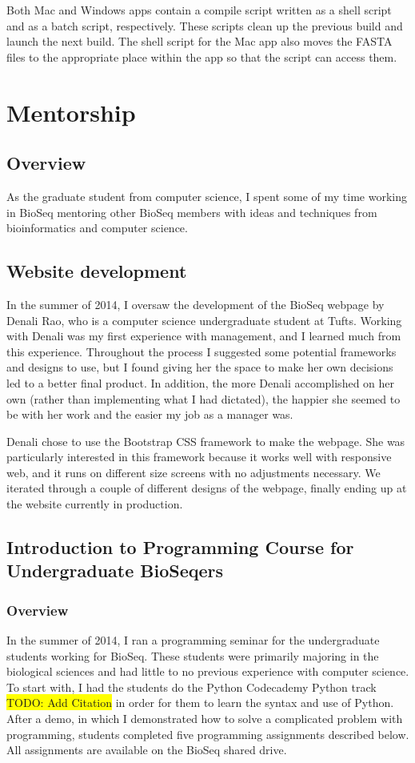 \documentclass{report}
\newcommand{\hilight}[1]
{\colorbox{yellow}{#1}}
\begin{document}
Both Mac and Windows apps contain a compile script written as a shell script and as a batch script, respectively. These scripts clean up the previous build and launch the next build. The shell script for the Mac app also moves the FASTA files to the appropriate place within the app so that the script can access them.


\chapter{Mentorship}
\section{Overview}
As the graduate student from computer science, I spent some of my time working in BioSeq mentoring other BioSeq members with ideas and techniques from  bioinformatics and computer science. 

\section{Website development}
In the summer of 2014, I oversaw the development of the BioSeq webpage by Denali Rao, who is a computer science undergraduate student at Tufts. Working with Denali was my first experience with management, and I learned much from this experience. Throughout the process I suggested some potential frameworks and designs to use, but I found giving her the space to make her own decisions led to a better final product. In addition, the more Denali accomplished on her own (rather than implementing what I had dictated), the happier she seemed to be with her work and the easier my job as a manager was.

Denali chose to use the Bootstrap CSS framework to make the webpage. She was particularly interested in this framework because it works well with responsive web, and it runs on different size screens with no adjustments necessary. We iterated through a couple of different designs of the webpage, finally ending up at the website currently in production.

\section{Introduction to Programming Course for Undergraduate BioSeqers}
\subsection{Overview}
In the summer of 2014, I ran a programming seminar for the undergraduate students working for BioSeq. These students were primarily majoring in the biological sciences and had little to no previous experience with computer science. To start with, I had the students do the Python Codecademy Python track \hilight{TODO: Add Citation} in order for them to learn the syntax and use of Python. After a demo, in which I demonstrated how to solve a complicated problem with programming, students completed five programming assignments described below. All assignments are available on the BioSeq shared drive.
\end{document}
